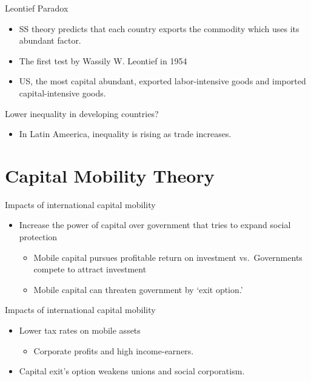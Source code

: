\documentclass[
]{book}
\providecommand{\tightlist}{%
  \setlength{\itemsep}{0pt}\setlength{\parskip}{0pt}}
\begin{document}
Leontief Paradox

\begin{itemize}
\item
  SS theory predicts that each country exports the commodity which uses its abundant factor.
\item
  The first test by Wassily W. Leontief in 1954
\item
  US, the most capital abundant, exported labor-intensive goods and imported capital-intensive goods.
\end{itemize}

Lower inequality in developing countries?

\begin{itemize}
\tightlist
\item
  In Latin Ameerica, inequality is rising as trade increases.
\end{itemize}

\hypertarget{capital-mobility-theory}{%
\section{Capital Mobility Theory}\label{capital-mobility-theory}}

Impacts of international capital mobility

\begin{itemize}
\item
  Increase the power of capital over government that tries to expand social protection

  \begin{itemize}
  \item
    Mobile capital pursues profitable return on investment vs.~Governments compete to attract investment
  \item
    Mobile capital can threaten government by `exit option.'
  \end{itemize}
\end{itemize}

Impacts of international capital mobility

\begin{itemize}
\item
  Lower tax rates on mobile assets

  \begin{itemize}
  \tightlist
  \item
    Corporate profits and high income-earners.
  \end{itemize}
\item
  Capital exit's option weakens unions and social corporatism.
\end{itemize}
\end{document}
